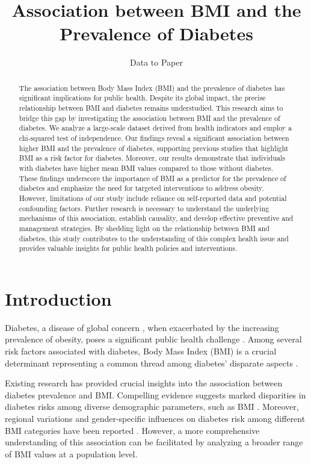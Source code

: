 \documentclass[11pt]{article}
\title{Association between BMI and the Prevalence of Diabetes}
\author{Data to Paper}
\begin{document}
\maketitle

\begin{abstract}
The association between Body Mass Index (BMI) and the prevalence of diabetes has significant implications for public health. Despite its global impact, the precise relationship between BMI and diabetes remains understudied. This research aims to bridge this gap by investigating the association between BMI and the prevalence of diabetes. We analyze a large-scale dataset derived from health indicators and employ a chi-squared test of independence. Our findings reveal a significant association between higher BMI and the prevalence of diabetes, supporting previous studies that highlight BMI as a risk factor for diabetes. Moreover, our results demonstrate that individuals with diabetes have higher mean BMI values compared to those without diabetes. These findings underscore the importance of BMI as a predictor for the prevalence of diabetes and emphasize the need for targeted interventions to address obesity. However, limitations of our study include reliance on self-reported data and potential confounding factors. Further research is necessary to understand the underlying mechanisms of this association, establish causality, and develop effective preventive and management strategies. By shedding light on the relationship between BMI and diabetes, this study contributes to the understanding of this complex health issue and provides valuable insights for public health policies and interventions.
\end{abstract}

\section*{Introduction}

Diabetes, a disease of global concern \cite{Uloko2018PrevalenceAR}, when exacerbated by the increasing prevalence of obesity, poses a significant public health challenge \cite{Mokdad2001TheCE}. Among several risk factors associated with diabetes, Body Mass Index (BMI) is a crucial determinant representing a common thread among diabetes' disparate aspects \cite{Zhu2019RacialEthnicDI, rnlv2010ImpactOB}.

Existing research has provided crucial insights into the association between diabetes prevalence and BMI. Compelling evidence suggests marked disparities in diabetes risks among diverse demographic parameters, such as BMI \cite{Read2021BMIAR}. Moreover, regional variations and gender-specific influences on diabetes risk among different BMI categories have been reported \cite{Rho2014IndependentIO}. However, a more comprehensive understanding of this association can be facilitated by analyzing a broader range of BMI values at a population level. 
\end{document}
